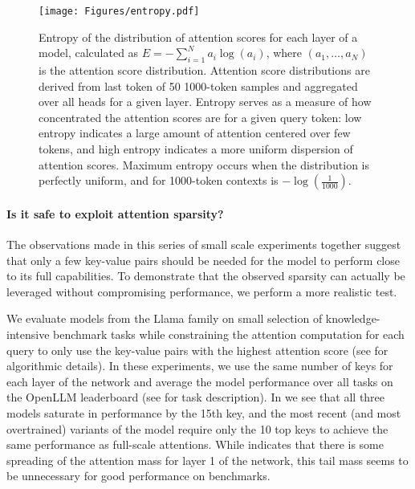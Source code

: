 \begin{figure}[h]
    \centering
    \texttt{[image: Figures/entropy.pdf]}
    \caption{
    Entropy of the distribution of attention scores for each layer of a model, calculated as $E = - \sum_{i=1}^N a_i\log(a_i)$, where $(a_1,\dots,a_N)$ is the attention score distribution.  Attention score distributions are derived from last token of 50 1000-token samples and aggregated over all heads for a given layer. Entropy serves as a measure of how concentrated the attention scores are for a given query token: low entropy indicates a large amount of attention centered over few tokens, and high entropy indicates a more uniform dispersion of attention scores. Maximum entropy occurs when the distribution is perfectly uniform, and for 1000-token contexts is $-\log(\frac{1}{1000})$. %
    }
    \label{fig:entropy}
\end{figure}


\paragraph{Is it safe to exploit attention sparsity?}

The observations made in this series of small scale experiments together suggest that
only a few key-value pairs should be needed for the model to perform close to its full capabilities. 
To demonstrate that the observed sparsity can actually be leveraged without compromising performance, we perform a more realistic test. 

We evaluate models from the Llama family on small selection of knowledge-intensive benchmark tasks while constraining the attention computation for each query to only use the \topk key-value pairs with the highest attention score (see  for algorithmic details). In these experiments, we use the same number of keys for each layer of the network and average the model performance over all tasks on the OpenLLM leaderboard (see  for task description). In  we see that all three models saturate in performance by the 15th key, and the most recent (and most overtrained) variants of the model require only the 10 top keys to achieve the same performance as full-scale attentions. While  indicates that there is some spreading of the attention mass for layer 1 of the network, this tail mass seems to be unnecessary for good performance on benchmarks.

